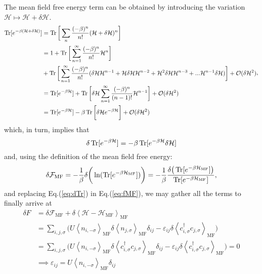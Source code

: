 The mean field free energy term can be obtained by introducing the variation $\mathcal{H} \mapsto \mathcal{H} + \delta \mathcal{H} $.
\begin{equation}\label{eq:varTr}
\begin{split}
\operatorname{Tr} [ e^{-\beta ( \mathcal{H} + \delta \mathcal{H} ) } ] &= \operatorname{Tr}  \bigg[ \sum_n \frac{(-\beta)^n}{n!} ( \mathcal{H} + \delta \mathcal{H} )^n \bigg] \\
&= 1 + \operatorname{Tr} \bigg[  \sum_{n=1}^{\infty} \frac{(-\beta)^n}{n!} \mathcal{H}^n \bigg] \\
& + \operatorname{Tr} \bigg[  \sum_{n=1}^{\infty} \frac{(-\beta)^n}{n!} (\delta \mathcal{H} \mathcal{H}^{n-1} +  \mathcal{H} \delta \mathcal{H} \mathcal{H}^{n-2} + \mathcal{H}^2 \delta \mathcal{H} \mathcal{H}^{n-3} + ... \mathcal{H}^{n-1} \delta \mathcal{H} ) \bigg] + \mathcal{O} ( \delta \mathcal{H}^2 ) \\
&= \operatorname{Tr} [ e^{-\beta \mathcal{H} } ] + \operatorname{Tr} \bigg[ \delta \mathcal{H} \sum_{n=1}^\infty \frac{(-\beta)^n}{(n-1)!} \mathcal{H}^{n-1} \bigg] + \mathcal{O} ( \delta \mathcal{H}^2 ) \\
&= \operatorname{Tr} [ e^{-\beta \mathcal{H} } ] - \beta \operatorname{Tr} \bigg[ \delta \mathcal{H} e^{-\beta \mathcal{H} } \bigg] + \mathcal{O} ( \delta \mathcal{H}^2 )
\end{split} ,
\end{equation}
which, in turn, implies that
\begin{equation}\label{eq:dTr}
\delta \operatorname{Tr} [ e^{-\beta \mathcal{H} } ] = -\beta \operatorname{Tr} [ e^{-\beta \mathcal{H} } \delta \mathcal{H} ] 
\end{equation}
and, using the definition of the mean field free energy:
\begin{equation}\label{eq:fMF}
\delta \mathcal{F}_{\text{MF}} = -\frac{1}{\beta} \delta \bigg( \ln ( \operatorname{Tr} [ e^{-\beta \mathcal{H}_{\text{MF}} } ] ) \bigg) = -\frac{1}{\beta} \frac{\delta \big( \operatorname{Tr} [e^{-\beta \mathcal{H}_\text{MF}} ] \big) }{\operatorname{Tr} [e^{-\beta \mathcal{H}_\text{MF}} ]} ,
\end{equation}
and replacing Eq.(\ref{eq:dTr}) in Eq.(\ref{eq:fMF}), we may gather all the terms to finally arrive at
\begin{equation}
\begin{split}
\delta F &= \delta \mathcal{F}_{\text{MF}} + \delta \left\langle \mathcal{H} - \mathcal{H}_{\text{MF}} \right\rangle_{\text{MF}} \\
&= \sum_{i, j, \sigma} \bigg( U \left\langle n_{i,-\sigma} \right\rangle_{\text{MF}} \delta \left\langle n_{j,\sigma} \right\rangle_{\text{MF}} \delta_{ij} - \varepsilon_{i j} \delta \left\langle c_{i, \sigma}^\dagger c_{j, \sigma} \right\rangle_{\text{MF}} \bigg) \\
&= \sum_{i, j, \sigma} \bigg( U \left\langle n_{i,-\sigma} \right\rangle_{\text{MF}} \delta \left\langle c_{i, \sigma}^\dagger c_{j,\sigma} \right\rangle_{\text{MF}} \delta_{ij} - \varepsilon_{i j} \delta \left\langle c_{i, \sigma}^\dagger c_{j, \sigma} \right\rangle_{\text{MF}} \bigg) = 0 \\
&\implies \varepsilon_{i j} = U \left\langle n_{i,-\sigma} \right\rangle_{\text{MF}} \delta_{i j} 
\end{split}
\end{equation}
